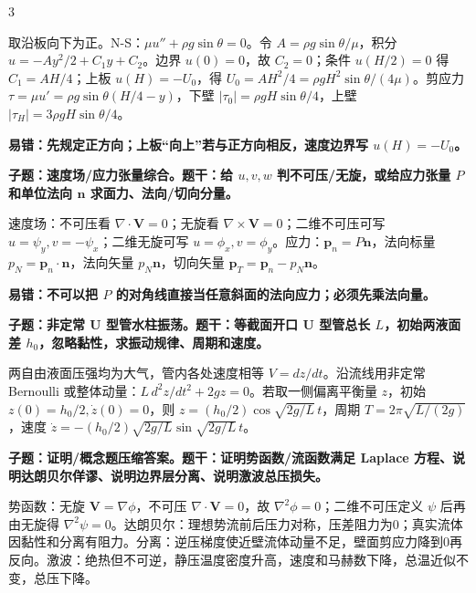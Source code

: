 \documentclass[a4paper]{article}
\newcommand{\qt}[1]{\vspace{0.10pt}\colorbox{Q}{\parbox{\dimexpr\linewidth-2\fboxsep}{\color{white}\bfseries #1}}\par}
\newcommand{\ans}[1]{\colorbox{G}{\parbox{\dimexpr\linewidth-2\fboxsep}{#1}}\par}
\newcommand{\warn}[1]{\colorbox{Y}{\parbox{\dimexpr\linewidth-2\fboxsep}{\color{E}\bfseries #1}}\par}
\begin{document}
\begin{multicols}{3}
\ans{取沿板向下为正。N-S：$\mu u''+\rho g\sin\theta=0$。令 $A=\rho g\sin\theta/\mu$，积分 $u=-Ay^2/2+C_1y+C_2$。边界 $u(0)=0$，故 $C_2=0$；条件 $u(H/2)=0$ 得 $C_1=AH/4$；上板 $u(H)=-U_0$，得 $U_0=AH^2/4=\rho gH^2\sin\theta/(4\mu)$。剪应力 $\tau=\mu u'=\rho g\sin\theta(H/4-y)$，下壁 $|\tau_0|=\rho gH\sin\theta/4$，上壁 $|\tau_H|=3\rho gH\sin\theta/4$。}
\warn{易错：先规定正方向；上板“向上”若与正方向相反，速度边界写 $u(H)=-U_0$。}
\qt{子题：速度场/应力张量综合。题干：给 $u,v,w$ 判不可压/无旋，或给应力张量 $P$ 和单位法向 $\bm n$ 求面力、法向/切向分量。}
\ans{速度场：不可压看 $\nabla\cdot\bm V=0$；无旋看 $\nabla\times\bm V=0$；二维不可压可写 $u=\psi_y,v=-\psi_x$；二维无旋可写 $u=\phi_x,v=\phi_y$。应力：$\bm p_n=P\bm n$，法向标量 $p_N=\bm p_n\cdot\bm n$，法向矢量 $p_N\bm n$，切向矢量 $\bm p_T=\bm p_n-p_N\bm n$。}
\warn{易错：不可以把 $P$ 的对角线直接当任意斜面的法向应力；必须先乘法向量。}
\qt{子题：非定常 U 型管水柱振荡。题干：等截面开口 U 型管总长 $L$，初始两液面差 $h_0$，忽略黏性，求振动规律、周期和速度。}
\ans{两自由液面压强均为大气，管内各处速度相等 $V=dz/dt$。沿流线用非定常 Bernoulli 或整体动量：$L\,d^2z/dt^2+2gz=0$。若取一侧偏离平衡量 $z$，初始 $z(0)=h_0/2,\dot z(0)=0$，则 $z=(h_0/2)\cos\sqrt{2g/L}\,t$，周期 $T=2\pi\sqrt{L/(2g)}$，速度 $\dot z=-(h_0/2)\sqrt{2g/L}\sin\sqrt{2g/L}\,t$。}
\qt{子题：证明/概念题压缩答案。题干：证明势函数/流函数满足 Laplace 方程、说明达朗贝尔佯谬、说明边界层分离、说明激波总压损失。}
\ans{势函数：无旋 $\bm V=\nabla\phi$，不可压 $\nabla\cdot\bm V=0$，故 $\nabla^2\phi=0$；二维不可压定义 $\psi$ 后再由无旋得 $\nabla^2\psi=0$。达朗贝尔：理想势流前后压力对称，压差阻力为0；真实流体因黏性和分离有阻力。分离：逆压梯度使近壁流体动量不足，壁面剪应力降到0再反向。激波：绝热但不可逆，静压温度密度升高，速度和马赫数下降，总温近似不变，总压下降。}


\end{multicols}
\end{document}
